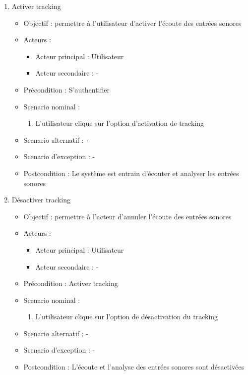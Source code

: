 \begin{enumerate}[label=\alph*.]
	\item Activer tracking
	\begin{itemize}
		\item Objectif : permettre à l’utilisateur d’activer l’écoute des entrées sonores
		\item Acteurs :
		\begin{itemize}
			\item Acteur principal : Utilisateur
			\item Acteur secondaire : -
		\end{itemize}
		\item Précondition : S’authentifier
		\item Scenario nominal :
		\begin{enumerate}[label=\arabic*.]
			\item L’utilisateur clique sur l’option d’activation de tracking
		\end{enumerate}
		\item Scenario alternatif : -
		\item Scenario d’exception : -
		\item Postcondition : Le système est entrain d'écouter et analyser les entrées sonores
	\end{itemize}
	
	\item Désactiver tracking
	\begin{itemize}
		\item Objectif : permettre à l’acteur d’annuler l’écoute des entrées sonores
		\item Acteurs :
		\begin{itemize}
			\item Acteur principal : Utilisateur
			\item Acteur secondaire : -
		\end{itemize}
		\item Précondition : Activer tracking
		\item Scenario nominal :
		\begin{enumerate}[label=\arabic*.]
			\item L’utilisateur clique sur l’option de désactivation du tracking
		\end{enumerate}
		\item Scenario alternatif : -
		\item Scenario d’exception : -
		\item Postcondition : L’écoute et l'analyse des entrées sonores sont désactivées
	\end{itemize}
	

\end{enumerate}
